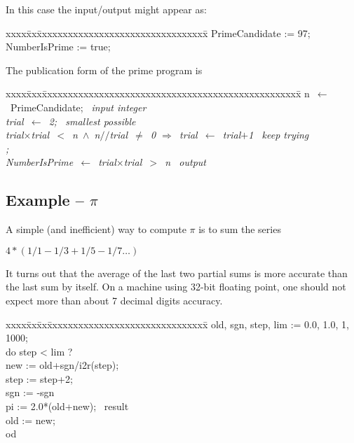 \noindent In this case the input/output might appear as:
\begin{tt}
\begin{tabbing}
xxxx\=xx\=xxxxxxxxxxxxxxxxxxxxxxxxxxxxxxxxx\=\kill
\>   PrimeCandidate := 97;               \\
\>   NumberIsPrime := true;
\end{tabbing}
\end{tt}

\noindent The publication form of the prime program is 
\begin{tabbing} 
xxxx\=xxx\=xxxxxxxxxxxxxxxxxxxxxxxxxxxxxxxxxxxxxxxxxxxxxxxxxx\=\kill
\>n\ $\leftarrow$\ PrimeCandidate;   \>\>\bq\em\ input integer \\
\>trial\ $\leftarrow$\ 2;            \>\>\bq\em\ smallest possible \\
 trial$\times$trial\ $<$\ n\ $\wedge$\ n$/\!/$trial\ $\ne$\ 0 $\Rightarrow$\
trial\ $\leftarrow$\ trial$+$1    \>\>\bq\em\ keep trying\\
;\\
\>NumberIsPrime\ $\leftarrow$\ trial$\times$trial\ $>$\ n \>\>\bq\em\ output 
\end{tabbing}

\subsection{Example -- $\pi$}

\noindent
A simple (and inefficient) way to compute $\pi$ is to sum the series

$4*(1/1 - 1/3 + 1/5 - 1/7\ldots)$

\noindent
It turns out that the average of the last two partial sums is more accurate 
than the last sum by itself.  
On a machine using 32-bit  floating point,
one should not expect more than about 7 decimal digits accuracy.

\begin{tt}
\begin{tabbing}
xxxx\=xx\=xx\=xxxxxxxxxxxxxxxxxxxxxxxxxxxxxxx\=\kill
\>  old, sgn, step, lim  := 0.0, 1.0, 1, 1000;              \\
\>  do  step < lim ?                                        \\
\>\>      new := old+sgn/i2r(step);                         \\
\>\>      step := step+2;                                   \\
\>\>      sgn := -sgn                                       \\
\>\>      pi := 2.0*(old+new);        \>\>\bq\ result       \\
\>\>      old := new;                                       \\
\>  od
\end{tabbing}
\end{tt}

